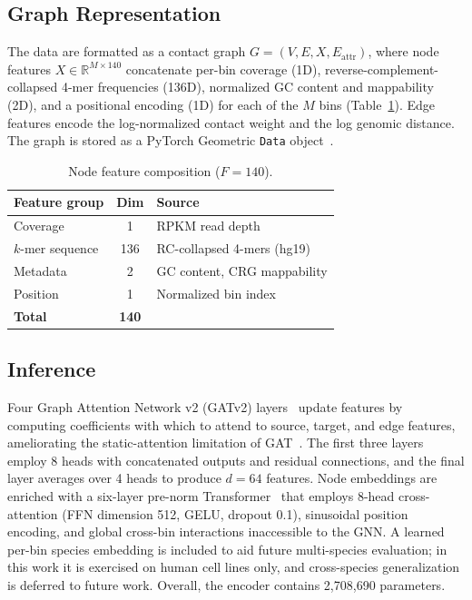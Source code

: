 \documentclass[conference]{IEEEtran}
\begin{document}
\subsection{Graph Representation}
The data are formatted as a contact graph
$G = (V, E, X, E_{\mathrm{attr}})$, where node features
$X \in \mathbb{R}^{M \times 140}$ concatenate per-bin coverage (1D),
reverse-complement-collapsed 4-mer frequencies (136D), normalized GC
content and mappability (2D), and a positional encoding (1D) for each of
the $M$ bins (Table~\ref{tab:features}). Edge features encode the
log-normalized contact weight and the log genomic distance. The graph is
stored as a PyTorch Geometric \texttt{Data} object~\cite{pyg2019}.

\begin{table}[t]
\caption{Node feature composition ($F = 140$).}
\label{tab:features}
\centering
\begin{tabular}{@{}lcl@{}}
\toprule
\textbf{Feature group} & \textbf{Dim} & \textbf{Source} \\
\midrule
Coverage        & 1   & RPKM read depth \\
$k$-mer sequence & 136 & RC-collapsed 4-mers (hg19) \\
Metadata        & 2   & GC content, CRG mappability \\
Position        & 1   & Normalized bin index \\
\midrule
\textbf{Total}  & \textbf{140} & \\
\bottomrule
\end{tabular}
\end{table}

\subsection{Inference}
Four Graph Attention Network v2 (GATv2) layers~\cite{brody2022} update
features by computing coefficients with which to attend to source,
target, and edge features, ameliorating the static-attention limitation
of GAT~\cite{velickovic2018}. The first three layers employ 8 heads with
concatenated outputs and residual connections, and the final layer
averages over 4 heads to produce $d = 64$ features. Node embeddings are
enriched with a six-layer pre-norm Transformer~\cite{vaswani2017} that
employs 8-head cross-attention (FFN dimension 512, GELU, dropout 0.1),
sinusoidal position encoding, and global cross-bin interactions
inaccessible to the GNN. A learned per-bin species embedding is included
to aid future multi-species evaluation; in this work it is exercised on
human cell lines only, and cross-species generalization is deferred to
future work. Overall, the encoder contains 2{,}708{,}690 parameters.
\end{document}
